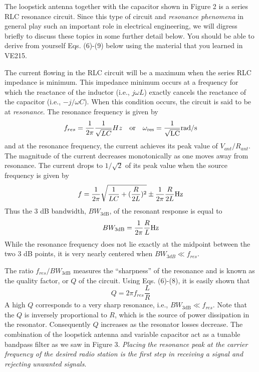 \documentclass[a4paper]{article}
\begin{document}
The loopstick antenna together with the capacitor shown in Figure 2 is a series RLC resonance circuit. Since this type of circuit and \textit{resonance phenomena} in general play such an important role in electrical engineering, we will digress briefly to discuss these topics in some further detail below. You should be able to derive from yourself Eqs. (6)-(9) below using the material that you learned in VE215.

The current flowing in the RLC circuit will be a maximum when the series RLC impedance is minimum. This impedance minimum occurs at a frequency for which the reactance of the inductor (i.e., $j\omega L$) exactly cancels the reactance of the capacitor (i.e., $-j/\omega C$). When this condition occurs, the circuit is said to be at \textit{resonance}. The resonance frequency is given by
\begin{equation}
	f_{res}=\frac{1}{2\pi}\frac{1}{\sqrt{LC}}Hz\quad\rm{or}\quad \omega_{res}=\frac{1}{\sqrt{LC}}\rm{rad/s}
\end{equation}
and at the resonance frequency, the current achieves its peak value of $V_{ant}/R_{ant}$. The magnitude of the current decreases monotonically as one moves away from resonance. The current drops to $1/\sqrt{2}$ of its peak value when the source frequency is given by
\begin{equation}
	f=\frac{1}{2\pi}\sqrt{\frac{1}{LC}+(\frac{R}{2L})^2}\pm\frac{1}{2\pi}\frac{R}{2L}\rm{Hz}
\end{equation}
Thus the 3 dB bandwidth, $BW_{3\mathrm{dB}}$, of the resonant response is equal to
\begin{equation}
	BW_{3\mathrm{dB}}=\frac{1}{2\pi}\frac{R}{L}\rm{Hz}
\end{equation}
While the resonance frequency does not lie exactly at the midpoint between the two 3 dB points, it is very nearly centered when $BW_{3dB}\ll f_{res}$.

The ratio $f_{res}/BW_{3\mathrm{dB}}$ measures the “sharpness” of the resonance and is known as the quality factor, or $Q$ of the circuit. Using Eqs. (6)-(8), it is easily shown that
\begin{equation}
	Q=2\pi f_{res}\frac{L}{R}
\end{equation}
A high $Q$ corresponds to a very sharp resonance, i.e., $BW_{3\mathrm{dB}}\ll f_{res}$. Note that the $Q$ is inversely proportional to $R$, which is the source of power dissipation in the resonator. Consequently $Q$ increases as the resonator losses decrease. The combination of the loopstick antenna and variable capacitor act as a tunable bandpass filter as we saw in Figure 3. \textit{Placing the resonance peak at the carrier frequency of the desired radio station is the first step in receiving a signal and rejecting unwanted signals}.
\end{document}
